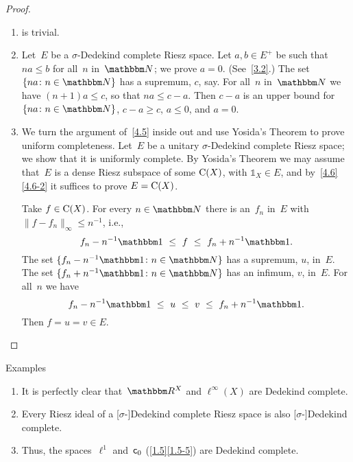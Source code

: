 \documentclass[main.tex]{subfiles}
\begin{document}
\begin{proof}
\begin{enumerate}
\item is trivial.
\item Let~$E$ be a $\sigma$-Dedekind complete Riesz space.
Let $a,b\in E^+$ be such that $na\leq b$ for all~$n$ in~$\N$;
we prove $a=0$. (See~\ref{3.2}.)
The set $\{na\colon n\in\N\}$ has a supremum, $c$, say.
For all~$n$ in~$\N$ we have $(n+1)a\leq c$,
so that $na\leq c-a$.
Then $c-a$ is an upper bound for $\{na\colon n\in \N\}$,
$c-a\geq c$, $a\leq 0$, and $a=0$.
%
\item We turn the argument of~\ref{4.5} inside out
and use Yosida's Theorem to prove uniform completeness.
Let~$E$ be a unitary $\sigma$-Dedekind complete Riesz space;
we show that it is uniformly complete.
By Yosida's Theorem we may assume
that~$E$ is a dense Riesz subspace of some $\mathrm{C}(X)$,
with $\mathbb{1}_X\in E$, 
and by~\ref{4.6}\ref{4.6-2}
it suffices to prove $E=\mathrm{C}(X)$.

Take $f\in\mathrm{C}(X)$.
For every $n\in\N$ there is an~$f_n$ in~$E$
with $\|f-f_n\|_\infty \leq n^{-1}$, i.e.,
\begin{equation*}
f_n-n^{-1}\mathbb{1}\ \leq\ f\ \leq\ f_n+n^{-1}\mathbb{1}\htam{.}
\end{equation*}
The set $\{f_n - n^{-1}\mathbb{1}\colon n\in\N\}$ has a supremum, 
$u$, in~$E$.
The set $\{f_n+n^{-1} \mathbb{1}\colon n\in \N\}$ has an infimum,
$v$, in~$E$.
For all~$n$ we have
\begin{equation*}
f_n-n^{-1}\mathbb{1}\ \leq\ u\ \leq\ v\ \leq\ f_n+n^{-1}\mathbb{1}\htam{.}
\end{equation*}
Then $f=u=v\in E$. \xqed
\end{enumerate}
\end{proof}
%
%
\begin{psec}{4.19}{Examples}
\begin{enumerate}
\item \label{4.19-1}
It is perfectly clear that~$\R^X$ and $\ell^\infty(X)$
are Dedekind complete.
\item \label{4.19-2}
Every Riesz ideal of a [$\sigma$-]Dedekind complete Riesz space
is also [$\sigma$-]Dedekind complete.
\item \label{4.19-3}
Thus, the spaces~$\ell^1$ and~$\mathsf{c}_0$ (\ref{1.5}\ref{1.5-5})
are Dedekind complete.
\end{enumerate}
\end{psec}
%
%
\end{document}
